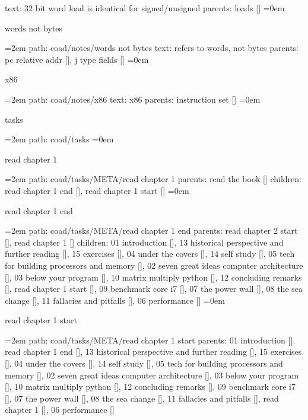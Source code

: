 \smallskip
text:  32 bit word load is identical for signed/unsigned
\smallskip
parents:  loads []
\smallskip
\leftskip=0em
\par\endgroup
\bigskip
{}
words not bytes
\smallskip
\par\begingroup
\leftskip=2em
path: coad/notes/words not bytes
\smallskip
text:  refers to words, not bytes
\smallskip
parents:  pc relative addr [], j type fields []
\smallskip
\leftskip=0em
\par\endgroup
\bigskip
{}
x86
\smallskip
\par\begingroup
\leftskip=2em
path: coad/notes/x86
\smallskip
text:  x86
\smallskip
parents:  instruction set []
\smallskip
\leftskip=0em
\par\endgroup
\bigskip
{}
tasks
\smallskip
\par\begingroup
\leftskip=2em
path: coad/tasks
\smallskip
\leftskip=0em
\par\endgroup
\bigskip
{}
read chapter 1
\smallskip
\par\begingroup
\leftskip=2em
path: coad/tasks/META/read chapter 1
\smallskip
parents:  read the book []
\smallskip
children: read chapter 1 end [], read chapter 1 start []
\smallskip
\leftskip=0em
\par\endgroup
\bigskip
{}
read chapter 1 end
\smallskip
\par\begingroup
\leftskip=2em
path: coad/tasks/META/read chapter 1 end
\smallskip
parents:  read chapter 2 start [], read chapter 1 []
\smallskip
children: 01 introduction [], 13 historical perspective and further reading [], 15 exercises [], 04 under the covers [], 14 self study [], 05 tech for building processors and memory [], 02 seven great ideas computer architecture [], 03 below your program [], 10 matrix multiply python [], 12 concluding remarks [], read chapter 1 start [], 09 benchmark core i7 [], 07 the power wall [], 08 the sea change [], 11 fallacies and pitfalls [], 06 performance []
\smallskip
\leftskip=0em
\par\endgroup
\bigskip
{}
read chapter 1 start
\smallskip
\par\begingroup
\leftskip=2em
path: coad/tasks/META/read chapter 1 start
\smallskip
parents:  01 introduction [], read chapter 1 end [], 13 historical perspective and further reading [], 15 exercises [], 04 under the covers [], 14 self study [], 05 tech for building processors and memory [], 02 seven great ideas computer architecture [], 03 below your program [], 10 matrix multiply python [], 12 concluding remarks [], 09 benchmark core i7 [], 07 the power wall [], 08 the sea change [], 11 fallacies and pitfalls [], read chapter 1 [], 06 performance []
